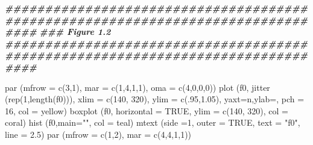 \documentclass[
]{book}
\newenvironment{Shaded}{\begin{snugshade}}{\end{snugshade}}
\newcommand{\AttributeTok}[1]{\textcolor[rgb]{0.77,0.63,0.00}{#1}}
\newcommand{\ConstantTok}[1]{\textcolor[rgb]{0.00,0.00,0.00}{#1}}
\newcommand{\DecValTok}[1]{\textcolor[rgb]{0.00,0.00,0.81}{#1}}
\newcommand{\DocumentationTok}[1]{\textcolor[rgb]{0.56,0.35,0.01}{\textbf{\textit{#1}}}}
\newcommand{\FloatTok}[1]{\textcolor[rgb]{0.00,0.00,0.81}{#1}}
\newcommand{\FunctionTok}[1]{\textcolor[rgb]{0.00,0.00,0.00}{#1}}
\newcommand{\NormalTok}[1]{#1}
\newcommand{\StringTok}[1]{\textcolor[rgb]{0.31,0.60,0.02}{#1}}
\begin{document}
\begin{Shaded}
\begin{Highlighting}[]
\DocumentationTok{\#\#\#\#\#\#\#\#\#\#\#\#\#\#\#\#\#\#\#\#\#\#\#\#\#\#\#\#\#\#\#\#\#\#\#\#\#\#\#\#\#\#\#\#\#\#\#\#\#\#\#\#\#\#\#\#\#\#\#\#\#\#\#\#\#\#\#\#\#\#\#\#\#\#\#\#\#\#\#\#}
\DocumentationTok{\#\#\# Figure 1.2}
\DocumentationTok{\#\#\#\#\#\#\#\#\#\#\#\#\#\#\#\#\#\#\#\#\#\#\#\#\#\#\#\#\#\#\#\#\#\#\#\#\#\#\#\#\#\#\#\#\#\#\#\#\#\#\#\#\#\#\#\#\#\#\#\#\#\#\#\#\#\#\#\#\#\#\#\#\#\#\#\#\#\#\#\#}

\FunctionTok{par}\NormalTok{ (}\AttributeTok{mfrow =} \FunctionTok{c}\NormalTok{(}\DecValTok{3}\NormalTok{,}\DecValTok{1}\NormalTok{), }\AttributeTok{mar =} \FunctionTok{c}\NormalTok{(}\DecValTok{1}\NormalTok{,}\DecValTok{4}\NormalTok{,}\DecValTok{1}\NormalTok{,}\DecValTok{1}\NormalTok{), }\AttributeTok{oma =} \FunctionTok{c}\NormalTok{(}\DecValTok{4}\NormalTok{,}\DecValTok{0}\NormalTok{,}\DecValTok{0}\NormalTok{,}\DecValTok{0}\NormalTok{))}
\FunctionTok{plot}\NormalTok{ (f0, }\FunctionTok{jitter}\NormalTok{ (}\FunctionTok{rep}\NormalTok{(}\DecValTok{1}\NormalTok{,}\FunctionTok{length}\NormalTok{(f0))), }\AttributeTok{xlim =} \FunctionTok{c}\NormalTok{(}\DecValTok{140}\NormalTok{, }\DecValTok{320}\NormalTok{), }\AttributeTok{ylim =} \FunctionTok{c}\NormalTok{(.}\DecValTok{95}\NormalTok{,}\FloatTok{1.05}\NormalTok{),}
      \AttributeTok{yaxt=}\StringTok{\textquotesingle{}n\textquotesingle{}}\NormalTok{,}\AttributeTok{ylab=}\StringTok{\textquotesingle{}\textquotesingle{}}\NormalTok{, }\AttributeTok{pch =} \DecValTok{16}\NormalTok{, }\AttributeTok{col =}\NormalTok{ yellow)}
\FunctionTok{boxplot}\NormalTok{ (f0, }\AttributeTok{horizontal =} \ConstantTok{TRUE}\NormalTok{, }\AttributeTok{ylim =} \FunctionTok{c}\NormalTok{(}\DecValTok{140}\NormalTok{, }\DecValTok{320}\NormalTok{), }\AttributeTok{col =}\NormalTok{ coral)}
\FunctionTok{hist}\NormalTok{ (f0,}\AttributeTok{main=}\StringTok{""}\NormalTok{, }\AttributeTok{col =}\NormalTok{ teal)}
\FunctionTok{mtext}\NormalTok{ (}\AttributeTok{side =}\DecValTok{1}\NormalTok{, }\AttributeTok{outer =} \ConstantTok{TRUE}\NormalTok{, }\AttributeTok{text =} \StringTok{"f0"}\NormalTok{, }\AttributeTok{line =} \FloatTok{2.5}\NormalTok{)}
\FunctionTok{par}\NormalTok{ (}\AttributeTok{mfrow =} \FunctionTok{c}\NormalTok{(}\DecValTok{1}\NormalTok{,}\DecValTok{2}\NormalTok{), }\AttributeTok{mar =} \FunctionTok{c}\NormalTok{(}\DecValTok{4}\NormalTok{,}\DecValTok{4}\NormalTok{,}\DecValTok{1}\NormalTok{,}\DecValTok{1}\NormalTok{))}


\end{Highlighting}
\end{Shaded}
\end{document}
